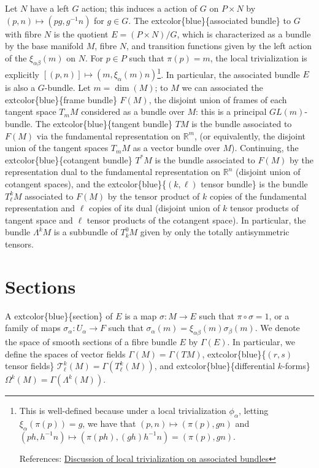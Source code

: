 \documentclass[
]{book}
\begin{document}
Let \(N\) have a left \(G\) action; this induces a action of \(G\) on \(P \times N\) by \((p,n) \mapsto (pg, g^{-1}n)\) for \(g \in G\). The extcolor\{blue\}\{associated bundle\} to \(G\) with fibre \(N\) is the quotient \(E = (P \times N) / G\), which is characterized as a bundle by the base manifold \(M\), fibre \(N\), and transition functions given by the left action of the \(\xi_{\alpha\beta}(m)\) on \(N\). For \(p \in P\) such that \(\pi(p) = m\), the local trivialization is explicitly \([(p, n)] \mapsto (m, \xi_\alpha(m)n)\)\footnote{This is well-defined because under a local trivialization \(\phi_{\alpha}\), letting \(\xi_\alpha(\pi(p)) = g\), we have that \((p,n) \mapsto (\pi(p), gn)\) and \((ph, h^{-1}n) \mapsto (\pi(ph), (gh)h^{-1}n) = (\pi(p), gn)\).

  References: \href{https://math.stackexchange.com/questions/2439177/how-to-prove-local-trivialization-of-fiber-bundle-associated-to-principal-bundle}{Discussion of local trivialization on associated bundles}}. In particular, the associated bundle \(E\) is also a \(G\)-bundle. Let \(m = \dim(M)\); to \(M\) we can associated the extcolor\{blue\}\{frame bundle\} \(F(M)\), the disjoint union of frames of each tangent space \(T_m M\) considered as a bundle over \(M\): this is a principal \(GL(m)\)-bundle. The extcolor\{blue\}\{tangent bundle\} \(TM\) is the bundle associated to \(F(M)\) via the fundamental representation on \(\mathbb{R}^m\), (or equivalently, the disjoint union of the tangent spaces \(T_m M\) as a vector bundle over \(M\)). Continuing, the extcolor\{blue\}\{cotangent bundle\} \(T^*M\) is the bundle associated to \(F(M)\) by the representation dual to the fundamental representation on \(\mathbb{R}^n\) (disjoint union of cotangent spaces), and the extcolor\{blue\}\{\((k, \ell)\) tensor bundle\} is the bundle \(T^k_\ell M\) associated to \(F(M)\) by the tensor product of \(k\) copies of the fundamental representation and \(\ell\) copies of its dual (disjoint union of \(k\) tensor products of tangent space and \(\ell\) tensor products of the cotangent space). In particular, the bundle \(\Lambda^k M\) is a subbundle of \(T^0_k M\) given by only the totally antisymmetric tensors.

\hypertarget{sections}{%
\section{Sections}\label{sections}}

A extcolor\{blue\}\{section\} of \(E\) is a map \(\sigma : M \to E\) such that \(\pi \circ \sigma = 1\), or a family of maps \(\sigma_\alpha : U_\alpha \to F\) such that \(\sigma_\alpha(m) = \xi_{\alpha\beta}(m)\sigma_\beta(m)\). We denote the space of smooth sections of a fibre bundle \(E\) by \(\Gamma(E)\). In particular, we define the spaces of vector fields \(\Gamma(M) = \Gamma(TM)\), extcolor\{blue\}\{\((r,s)\) tensor fields\} \(\mathcal{T}^k_\ell(M) = \Gamma(T^k_\ell(M))\), and extcolor\{blue\}\{differential \(k\)-forms\} \(\Omega^k(M) = \Gamma(\Lambda^k(M))\).
\end{document}
